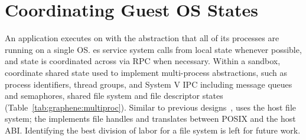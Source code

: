 \section{Coordinating Guest OS States}
\label{sec:graphene:namespaces}



An application executes on \sysname{} 
with the abstraction that all of its processes are running on a single OS.
\sysname{} \libos{}es service system calls
from local \libos{} state whenever possible,
and state is coordinated across \picoprocs{} via RPC when necessary.
Within a sandbox, \sysname{} \picoprocs{} 
coordinate shared state used to implement multi-process
abstractions, such as process identifiers, thread groups, and 
System V IPC including message queues and semaphores, shared file system and file descriptor states (Table~\ref{tab:graphene:multiproc}).
Similar to previous designs~\citep{porter11drawbridge,baumann13bascule}, 
\sysname{} uses the host file system; 
the \libos{} implements file handles and translates between POSIX and the host ABI.
Identifying the best division of labor for a \libos{} file system is 
left for future work.

